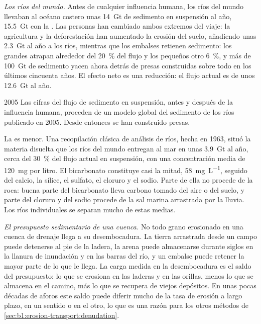 \emph{Los ríos del mundo.} Antes de cualquier influencia humana, los ríos del mundo llevaban al océano costero unas \qty{14}{Gt} de sedimento en
suspensión al año, \qty{15.5}{Gt} con la . Las personas han cambiado ambos extremos del viaje: la agricultura y la deforestación
han aumentado la erosión del suelo, añadiendo unas \qty{2.3}{Gt} al año a los ríos, mientras que los embalses retienen sedimento: los grandes
atrapan alrededor del \qty{20}{\percent} del flujo y los pequeños otro \qty{6}{\percent}, y más de \qty{100}{Gt} de sedimento yacen ahora detrás de
presas construidas sobre todo en los últimos cincuenta años. El efecto neto es una reducción: el flujo actual es de unos \qty{12.6}{Gt} al año.

\begin{dated}{2005}
Las cifras del flujo de sedimento en suspensión, antes y después de la influencia humana, proceden de un modelo global del sedimento de los
ríos publicado en 2005. Desde entonces se han construido presas.
\end{dated}

La  es menor. Una recopilación clásica de análisis de ríos, hecha en 1963, situó la materia disuelta que los ríos del mundo entregan al mar
en unas \qty{3.9}{Gt} al año, cerca del \qty{30}{\percent} del flujo actual en suspensión, con una concentración media de \qty{120}{mg} por litro.
El bicarbonato constituye casi la mitad, \qty{58}{mg.L^{-1}}, seguido del calcio, la sílice, el sulfato, el cloruro y el sodio. Parte de ella no procede
de la roca: buena parte del bicarbonato lleva carbono tomado del aire o del suelo, y parte del cloruro y del sodio procede de la sal marina arrastrada
por la lluvia. Los ríos individuales se separan mucho de estas medias.

\emph{El presupuesto sedimentario de una cuenca.} No todo grano erosionado en una cuenca de drenaje llega a su desembocadura. La tierra arrastrada
desde un campo puede detenerse al pie de la ladera, la arena puede almacenarse durante siglos en la llanura de inundación y en las barras del río, y un
embalse puede retener la mayor parte de lo que le llega. La carga medida en la desembocadura es el saldo del presupuesto: lo que se erosiona en las laderas
y en las orillas, menos lo que se almacena en el camino, más lo que se recupera de viejos depósitos. En unas pocas décadas de aforos este saldo puede
diferir mucho de la tasa de erosión a largo plazo, en un sentido o en el otro, lo que es una razón para los otros métodos de
\cref{sec:b1:erosion-transport:denudation}.

